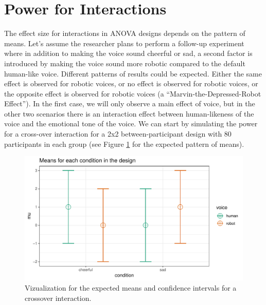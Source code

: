 \documentclass[,jou, draftfirst, a4paper,floatsintext]{apa6}
\begin{document}
\hypertarget{power-for-interactions}{%
\section{Power for Interactions}\label{power-for-interactions}}

The effect size for interactions in ANOVA designs depends on the pattern of means.
Let's assume the researcher plans to perform a follow-up experiment where in addition to making the voice sound cheerful or sad, a second factor is introduced by making the voice sound more robotic compared to the default human-like voice.
Different patterns of results could be expected.
Either the same effect is observed for robotic voices, or no effect is observed for robotic voices, or the opposite effect is observed for robotic voices (a \enquote{Marvin-the-Depressed-Robot Effect}).
In the first case, we will only observe a main effect of voice, but in the other two scenarios there is an interaction effect between human-likeness of the voice and the emotional tone of the voice. We can start by simulating the power for a cross-over interaction for a 2x2 between-participant design with 80 participants in each group (see Figure \ref{fig:mean-plot} for the expected pattern of means).

\begin{figure}
\centering
\includegraphics{0.1_Simulation_Based_Power_Analysis_For_Factorial_ANOVA_Designs_files/figure-latex/mean-plot-1.pdf}
\caption{\label{fig:mean-plot}Vizualization for the expected means and confidence intervals for a crossover interaction.}
\end{figure}
\end{document}
